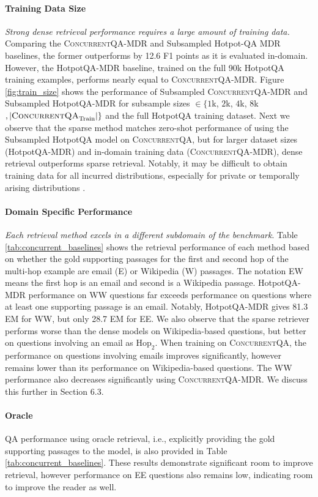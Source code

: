 \documentclass{article}
\renewcommand\cite{\citep}	\newcommand\shortcite{\citeyearpar}\newcommand\newcite{\citet}
\newcommand{\datasetname}{\textsc{ConcurrentQA}\xspace}
\begin{document}
\paragraph{Training Data Size} \textit{Strong dense retrieval performance requires a large amount of training data.} 
Comparing the \datasetname-MDR and Subsampled Hotpot-QA MDR baselines, the former outperforms by 12.6 F1 points as it is evaluated in-domain. However, the HotpotQA-MDR baseline, trained on the full 90k HotpotQA training examples, performs nearly equal to \datasetname-MDR. 
Figure \ref{fig:train_size} shows the performance of Subsampled \datasetname-MDR and Subsampled HotpotQA-MDR for subsample sizes $\in \{1$k, $2$k, $4$k, $8$k$, |\datasetname_\text{Train}|\}$ and the full HotpotQA training dataset. 
Next we observe that the sparse method matches zero-shot performance of using the Subsampled HotpotQA model on \datasetname, but for larger dataset sizes (HotpotQA-MDR) and in-domain training data (\datasetname-MDR), dense retrieval outperforms sparse retrieval.
Notably, it may be difficult to obtain training data for all incurred distributions, especially for private or temporally arising distributions \cite{hawking2004enterprisesearch, chitrita2005personalmetadata}. 

\paragraph{Domain Specific Performance} \textit{Each retrieval method excels in a different subdomain of the benchmark}.  Table \ref{tab:concurrent_baselines} shows the retrieval performance of each method based on whether the gold supporting passages for the first and second hop of the multi-hop example are email (E) or Wikipedia (W) passages. The notation EW means the first hop is an email and second is a Wikipedia passage. HotpotQA-MDR performance on WW questions far exceeds performance on questions where at least one supporting passage is an email. Notably, HotpotQA-MDR gives 81.3 EM for WW, but only 28.7 EM for EE. We also observe that the sparse retriever performs worse than the dense models on Wikipedia-based questions, but better on questions involving an email as $\mathrm{Hop_2}$.
When training on \datasetname, the performance on questions involving emails improves significantly, however remains lower than its performance on Wikipedia-based questions. The WW performance also decreases significantly using \datasetname-MDR. 
We discuss this further in Section 6.3.

\paragraph{Oracle} QA performance using oracle retrieval, i.e., explicitly providing the gold supporting passages to the model, is also provided in Table \ref{tab:concurrent_baselines}. These results demonstrate significant room to improve retrieval, however performance on EE questions also remains low, indicating room to improve the reader as well. 
\end{document}
